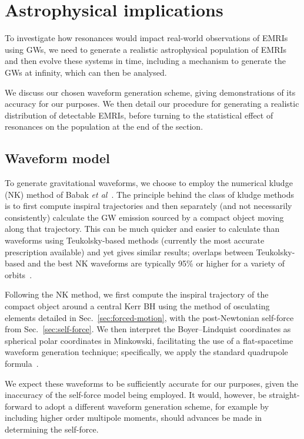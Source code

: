 \documentclass[aps,prd,amsfonts,amssymb,amsmath,nofootinbib,reprint,showpacs,superscriptaddress,twocolumn]{revtex4}
\newcommand{\secref}[1]{Sec.\ \ref{sec:#1}}
\begin{document}
\section{Astrophysical implications}
\label{sec:astrophysics}

To investigate how resonances would impact real-world observations of EMRIs using GWs, we need to generate a realistic astrophysical population of EMRIs and then evolve these systems in time, including a mechanism to generate the GWs at infinity, which can then be analysed.

We discuss our chosen waveform generation scheme, giving demonstrations of its accuracy for our purposes. We then detail our procedure for generating a realistic distribution of detectable EMRIs, before turning to the statistical effect of resonances on the population at the end of the section.

\subsection{Waveform model}

To generate gravitational waveforms, we choose to employ the numerical kludge (NK) method of Babak \emph{et al}~\cite{Babak2007}. The principle behind the class of kludge methods is to first compute inspiral trajectories and then separately (and not necessarily consistently) calculate the GW emission sourced by a compact object moving along that trajectory. This can be much quicker and easier to calculate than waveforms using Teukolsky-based methods (currently the most accurate prescription available) and yet gives similar results; overlaps between Teukolsky-based and the best NK waveforms are typically 95\% or higher for a variety of orbits~\cite{Babak2007, Berry2013}.

Following the NK method, we first compute the inspiral trajectory of the compact object around a central Kerr BH using the method of osculating elements detailed in \secref{forced-motion}, with the post-Newtonian self-force from \secref{self-force}. We then interpret the Boyer--Lindquist coordinates as spherical polar coordinates in Minkowski, facilitating the use of a flat-spacetime waveform generation technique; specifically, we apply the standard quadrupole formula~\cite{Misner1973}.

We expect these waveforms to be sufficiently accurate for our purposes, given the inaccuracy of the self-force model being employed. It would, however, be straight-forward to adopt a different waveform generation scheme, for example by including higher order multipole moments, should advances be made in determining the self-force.
\end{document}
